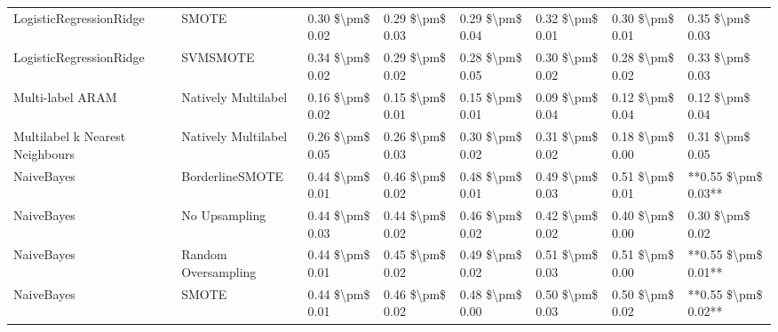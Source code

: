 \begin{tabular}{llllllll}
        LogisticRegressionRidge &                         SMOTE & 0.30 \$\textbackslash pm\$ 0.02 &           0.29 \$\textbackslash pm\$ 0.03 &       0.29 \$\textbackslash pm\$ 0.04 &        0.32 \$\textbackslash pm\$ 0.01 &                         0.30 \$\textbackslash pm\$ 0.01 &     0.35 \$\textbackslash pm\$ 0.03 \\
        LogisticRegressionRidge &                      SVMSMOTE & 0.34 \$\textbackslash pm\$ 0.02 &           0.29 \$\textbackslash pm\$ 0.02 &       0.28 \$\textbackslash pm\$ 0.05 &        0.30 \$\textbackslash pm\$ 0.02 &                         0.28 \$\textbackslash pm\$ 0.02 &     0.33 \$\textbackslash pm\$ 0.03 \\
               Multi-label ARAM &           Natively Multilabel & 0.16 \$\textbackslash pm\$ 0.02 &           0.15 \$\textbackslash pm\$ 0.01 &       0.15 \$\textbackslash pm\$ 0.01 &        0.09 \$\textbackslash pm\$ 0.04 &                         0.12 \$\textbackslash pm\$ 0.04 &     0.12 \$\textbackslash pm\$ 0.04 \\
Multilabel k Nearest Neighbours &           Natively Multilabel & 0.26 \$\textbackslash pm\$ 0.05 &           0.26 \$\textbackslash pm\$ 0.03 &       0.30 \$\textbackslash pm\$ 0.02 &        0.31 \$\textbackslash pm\$ 0.02 &                         0.18 \$\textbackslash pm\$ 0.00 &     0.31 \$\textbackslash pm\$ 0.05 \\
                     NaiveBayes &               BorderlineSMOTE & 0.44 \$\textbackslash pm\$ 0.01 &           0.46 \$\textbackslash pm\$ 0.02 &       0.48 \$\textbackslash pm\$ 0.01 &        0.49 \$\textbackslash pm\$ 0.03 &                         0.51 \$\textbackslash pm\$ 0.01 & **0.55 \$\textbackslash pm\$ 0.03** \\
                     NaiveBayes &                 No Upsampling & 0.44 \$\textbackslash pm\$ 0.03 &           0.44 \$\textbackslash pm\$ 0.02 &       0.46 \$\textbackslash pm\$ 0.02 &        0.42 \$\textbackslash pm\$ 0.02 &                         0.40 \$\textbackslash pm\$ 0.00 &     0.30 \$\textbackslash pm\$ 0.02 \\
                     NaiveBayes &           Random Oversampling & 0.44 \$\textbackslash pm\$ 0.01 &           0.45 \$\textbackslash pm\$ 0.02 &       0.49 \$\textbackslash pm\$ 0.02 &        0.51 \$\textbackslash pm\$ 0.03 &                         0.51 \$\textbackslash pm\$ 0.00 & **0.55 \$\textbackslash pm\$ 0.01** \\
                     NaiveBayes &                         SMOTE & 0.44 \$\textbackslash pm\$ 0.01 &           0.46 \$\textbackslash pm\$ 0.02 &       0.48 \$\textbackslash pm\$ 0.00 &        0.50 \$\textbackslash pm\$ 0.03 &                         0.50 \$\textbackslash pm\$ 0.02 & **0.55 \$\textbackslash pm\$ 0.02** \\

\end{tabular}
